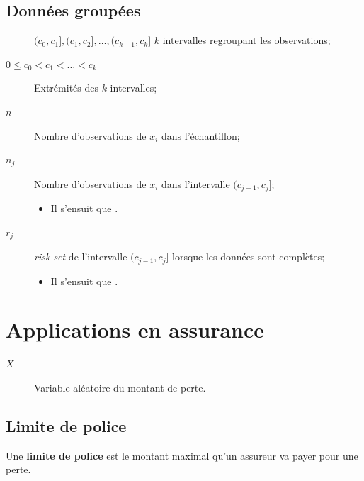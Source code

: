 \documentclass[10pt, french]{article}
\begin{document}
\begin{multicols*}{2}
\columnbreak
\subsection{Données groupées}
\begin{distributions}[Notation]
\begin{description}
	\item[]	$(c_{0}, c_{1}], (c_{1}, c_{2}], \dots, (c_{k - 1}, c_{k}]$	$k$ intervalles regroupant les observations;
	\item[$0	\leq	c_{0}	<	c_{1}	<	\hdots	<	c_{k}$]	Extrémités des $k$ intervalles;
	\item[$n$]	Nombre d'observations de $x_{i}$ dans l'échantillon;
	\item[$n_{j}$]	Nombre d'observations de $x_{i}$ dans l'intervalle $(c_{j - 1}, c_{j}]$;
		\begin{itemize}[leftmargin = *]
		\item	Il s'ensuit que .
		\end{itemize}
	\item[$r_{j}$]	\og \textit{risk set} \fg{} de l'intervalle $(c_{j - 1}, c_{j}]$ lorsque les données sont complètes;
		\begin{itemize}[leftmargin = *]
		\item	Il s'ensuit que .
		\end{itemize}
\end{description}
\end{distributions}


\columnbreak
\section{Applications en assurance}
\begin{distributions}[Notation]
\begin{description}
	\item[$X$]	Variable aléatoire du montant de perte.
\end{description}
\end{distributions}


\subsection{Limite de police}
\begin{definitionNOHFILL}
Une \textbf{limite de police}  est le montant maximal qu'un assureur va payer pour une perte.\\



\end{definitionNOHFILL}
\end{multicols*}
\end{document}
